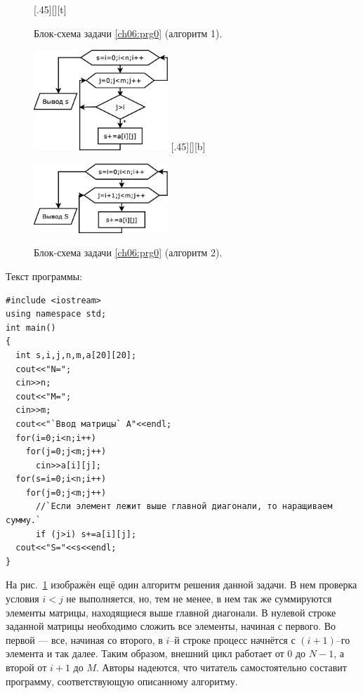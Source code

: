 \begin{figure}[H]
\begin{floatrow}
[.45\textwidth][\FBheight][t]
{\caption{Блок-схема задачи \ref{ch06:prg0} (алгоритм 1).}
\label{ch06:refDrawing6}}
{\includegraphics[width=0.45\textwidth,keepaspectratio]{img/ris_6_7}}\hspace*{0.05\textwidth}
%
[.45\textwidth][\FBheight][b]
{\caption{Блок-схема задачи \ref{ch06:prg0} (алгоритм 2).}
\label{ch06:refDrawing7}}
{\includegraphics[width=0.45\textwidth,keepaspectratio]{img/ris_6_8}}
\end{floatrow}
\end{figure}



Текст программы: 
\begin{lstlisting}
#include <iostream>
using namespace std;
int main()
{
  int s,i,j,n,m,a[20][20]; 
  cout<<"N=";
  cin>>n;
  cout<<"M=";
  cin>>m;
  cout<<"`Ввод матрицы` A"<<endl;
  for(i=0;i<n;i++)
    for(j=0;j<m;j++)
      cin>>a[i][j];
  for(s=i=0;i<n;i++)
    for(j=0;j<m;j++)
      //`Если элемент лежит выше главной диагонали, то наращиваем сумму.` 
      if (j>i) s+=a[i][j];
  cout<<"S="<<s<<endl;
}
\end{lstlisting}

На рис.~\ref{ch06:refDrawing7} изображён ещё один алгоритм решения данной задачи. 
В нем проверка условия  $i<j$ не выполняется, но, тем не менее, в нем так же 
суммируются элементы матрицы, находящиеся выше главной диагонали. В
нулевой строке заданной матрицы необходимо сложить все элементы, начиная с первого. Во первой --- все, начиная со
второго, в $i$–й строке процесс начнётся с $(i+1)$–го элемента и так далее. Таким образом, внешний цикл работает от 0 до
$N-1$, а второй от $i+1$ до $M$. Авторы надеются, что читатель самостоятельно составит программу, соответствующую
описанному алгоритму.

